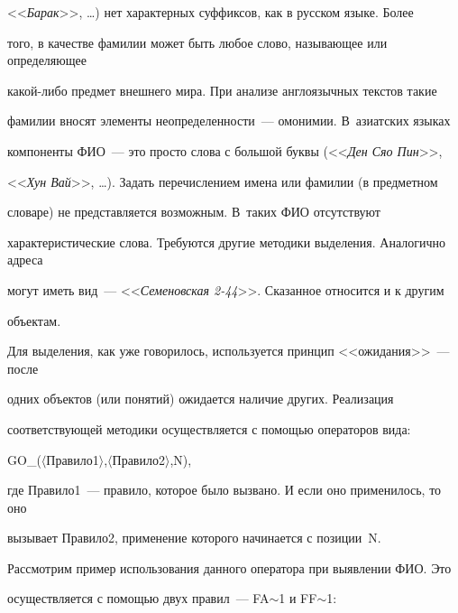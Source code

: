 <<\textit{Барак}>>, \ldots) нет характерных суффиксов, как в русском языке. Более 


того, в качестве фамилии может быть любое слово, называющее или определяющее 


какой-либо предмет внешнего мира. При анализе англоязычных текстов такие 


фамилии вносят элементы неопределенности~--- омонимии. В~азиатских языках 


компоненты ФИО~--- это просто слова с большой буквы (<<\textit{Ден Сяо Пин}>>, 


<<\textit{Хун Вай}>>, \ldots). Задать перечислением имена или фамилии (в предметном 


словаре) не представляется возможным. В~таких ФИО отсутствуют 


характеристические слова. Требуются другие методики выделения. Аналогично адреса 


могут иметь вид~--- <<\textit{Семеновская 2-44}>>. Сказанное относится и к другим 


объектам.





Для выделения, как уже говорилось, используется принцип <<ожидания>>~--- после 


одних объектов (или понятий) ожидается наличие других. Реализация 


соответствующей методики осуществляется с помощью операторов вида:





{\sf GO\_($\langle$Правило1$\rangle$,$\langle$Правило2$\rangle$,N)}, 





\noindent


где  Правило1~--- правило, которое было вызвано. И если оно применилось, то оно 


вызывает Правило2, применение которого начинается с позиции~N.  





Рассмотрим пример использования данного оператора при выявлении ФИО. Это 


осуществляется с помощью двух правил~--- {\sf FA$\sim$1} и {\sf FF$\sim$1}:


   


